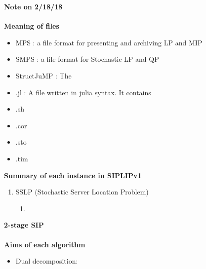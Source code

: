 \documentclass[11pt,english]{article}
\begin{document}
\newpage
{\Large \textbf{Note on 2/18/18}}\\ \\
\textbf{Meaning of files}
\begin{itemize}
	\item MPS : a file format for presenting and archiving LP and MIP
	\item SMPS : a file format for Stochastic LP and QP
	\item StructJuMP : The 
	\item .jl : A file written in julia syntax. It contains 
	\item .sh
	\item .cor
	\item .sto
	\item .tim
\end{itemize}

\newpage
\textbf{Summary of each instance in SIPLIPv1}
\begin{enumerate}
	\item SSLP (Stochastic Server Location Problem)
	\begin{enumerate}
		\item 
	\end{enumerate}
\end{enumerate}
\newpage
{\Large\textbf{2-stage SIP}}\\ \\
\textbf{Aims of each algorithm}
\begin{itemize}
	\item Dual decomposition: 
\end{itemize}
\end{document}

